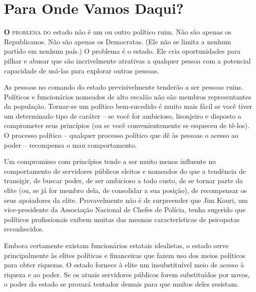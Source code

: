 
\chapter{Para Onde Vamos Daqui?}
\label{chap:6}

\lettrine[lines=2]{\textcolor{LettrineColor}{\textbf{O}}}{ problema do} estado não é um ou outro político ruim. Não são apenas os Republicanos. Não são apenas os Democratas. (Ele não se limita a nenhum partido em nenhum país.) O problema é o estado. Ele cria oportunidades para pilhar e abusar que são incrivelmente atrativas a qualquer pessoa com a potencial capacidade de usá-las para explorar outras pessoas.

As pessoas no comando do estado previsivelmente tenderão a ser pessoas ruins. Políticos e funcionários nomeados de alto escalão não são membros representantes da população. Tornar-se um político bem-sucedido é muito mais fácil se você tiver um determinado tipo de caráter -- se você for ambicioso, lisonjeiro e disposto a comprometer seus princípios (ou se você convenientemente se esqueceu de tê-los). O processo político -- qualquer processo político que dê às pessoas o acesso ao poder -- recompensa o mau comportamento.

Um compromisso com princípios tende a ser muito menos influente no comportamento de servidores públicos eleitos e nomeados do que a tendência de transigir, de buscar poder, de ser ambicioso a todo custo, de se tornar parte da elite (ou, se já for membro dela, de consolidar a sua posição), de recompensar os seus apoiadores da elite. Provavelmente não é de surpreender que Jim Kouri, um vice-presidente da Associação Nacional de Chefes de Polícia, tenha sugerido que políticos profissionais exibem muitas das mesmas características de psicopatas reconhecidos.

Embora certamente existam funcionários estatais idealistas, o estado serve principalmente às elites políticas e financeiras que fazem uso dos meios políticos para obter riquezas. O estado fornece à elite um insubstituível meio de acesso à riqueza e ao poder. Se os atuais servidores públicos forem substituídos por novos, o poder do estado se provará tentador demais para que muitos deles resistam.

